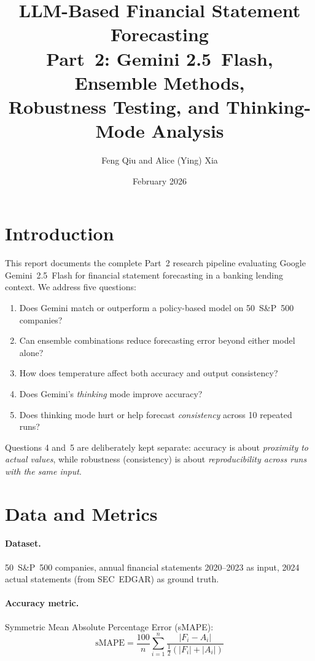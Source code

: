 \documentclass[11pt,a4paper]{article}
\title{\textbf{LLM-Based Financial Statement Forecasting} \\[4pt]
       \large Part~2: Gemini 2.5~Flash, Ensemble Methods, \\
       Robustness Testing, and Thinking-Mode Analysis}
\author{Feng Qiu and Alice (Ying) Xia}
\date{February 2026}
\begin{document}
\maketitle
\tableofcontents
\newpage

\section{Introduction}

This report documents the complete Part~2 research pipeline evaluating
Google Gemini~2.5~Flash for financial statement forecasting in a banking
lending context.  We address five questions:

\begin{enumerate}
  \item Does Gemini match or outperform a policy-based model on 50~S\&P~500 companies?
  \item Can ensemble combinations reduce forecasting error beyond either model alone?
  \item How does temperature affect both accuracy and output consistency?
  \item Does Gemini's \emph{thinking} mode improve accuracy?
  \item Does thinking mode hurt or help forecast \emph{consistency} across 10 repeated runs?
\end{enumerate}

Questions 4 and~5 are deliberately kept separate: accuracy is about
\emph{proximity to actual values}, while robustness (consistency) is about
\emph{reproducibility across runs with the same input}.

\section{Data and Metrics}

\paragraph{Dataset.}
50~S\&P~500 companies, annual financial statements 2020--2023 as input,
2024 actual statements (from SEC~EDGAR) as ground truth.

\paragraph{Accuracy metric.}  Symmetric Mean Absolute Percentage Error (sMAPE):
\begin{equation}
  \text{sMAPE} = \frac{100}{n}\sum_{i=1}^{n}
    \frac{\lvert F_i-A_i\rvert}{\tfrac{1}{2}(\lvert F_i\rvert+\lvert A_i\rvert)}
  \label{eq:smape}
\end{equation}
\end{document}
